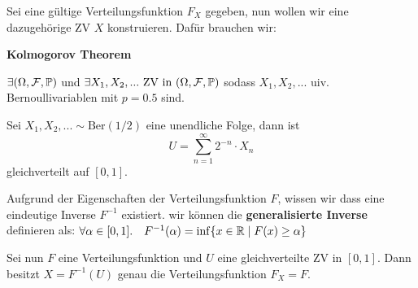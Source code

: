 \columnbreak



Sei eine gültige Verteilungsfunktion $F_X$ gegeben, nun wollen wir eine dazugehörige ZV $X$ konstruieren. Dafür brauchen wir: \medskip

\begin{tcolorbox}
    \textbf{Kolmogorov Theorem} \smallskip
    
    $\exists (\Omega, \mathcal{F}, \mathbb{P})$ und $\exists X_1, X_2, ... \text{ ZV in } (\Omega, \mathcal{F}, \mathbb{P})$ sodass $X_1, X_2, ...$ uiv. Bernoullivariablen mit $p = 0.5$ sind.
\end{tcolorbox}

Sei $X_1, X_2,... \sim \text{Ber}(1/2)$ eine unendliche Folge, dann ist 
$$U = \sum_{n = 1}^\infty 2^{-n}\cdot X_n$$ 
gleichverteilt auf $[0,1]$. \medskip

Aufgrund der Eigenschaften der Verteilungsfunktion $F$, wissen wir dass eine eindeutige Inverse $F^{-1}$ existiert. wir können die \textbf{generalisierte Inverse} definieren als: $\forall \alpha \in [0,1]. \quad F^{-1}(\alpha) = \inf \{x \in \mathbb{R} \; | \; F(x) \geq \alpha\}$ \medskip

Sei nun $F$ eine Verteilungsfunktion und $U$ eine gleichverteilte ZV in $[0,1]$. Dann besitzt $X = F^{-1}(U)$ genau die Verteilungsfunktion $F_X = F$. 